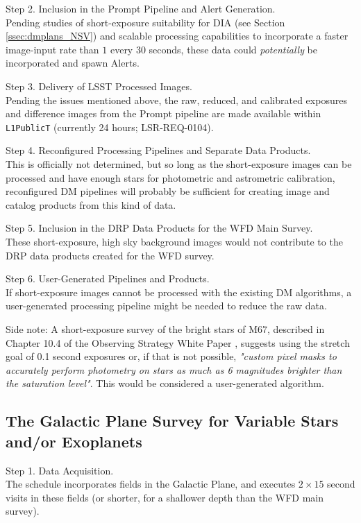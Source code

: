 \documentclass[DM,lsstdoc,toc]{lsstdoc}
\begin{document}
Step 2. Inclusion in the Prompt Pipeline and Alert Generation. \\
Pending studies of short-exposure suitability for DIA (see Section \ref{ssec:dmplans_NSV}) and scalable processing capabilities to incorporate a faster image-input rate than $1$ every $30$ seconds, these data could {\it potentially} be incorporated and spawn Alerts.

Step 3. Delivery of LSST Processed Images. \\
Pending the issues mentioned above, the raw, reduced, and calibrated exposures and difference images from the Prompt pipeline are made available within  \texttt{L1PublicT} (currently 24 hours; LSR-REQ-0104).

Step 4. Reconfigured Processing Pipelines and Separate Data Products. \\
This is officially not determined, but so long as the short-exposure images can be processed and have enough stars for photometric and astrometric calibration, reconfigured DM pipelines will probably be sufficient for creating image and catalog products from this kind of data.

Step 5. Inclusion in the DRP Data Products for the WFD Main Survey. \\
These short-exposure, high sky background images would not contribute to the DRP data products created for the WFD survey.

Step 6. User-Generated Pipelines and Products. \\
If short-exposure images cannot be processed with the existing DM algorithms, a user-generated processing pipeline might be needed to reduce the raw data. 

Side note: A short-exposure survey of the bright stars of M67, described in Chapter 10.4 of the Observing Strategy White Paper \citep{2017arXiv170804058L}, suggests using the stretch goal of 0.1 second exposures or, if that is not possible, \textit{"custom pixel masks to accurately perform photometry on stars as much as 6 magnitudes brighter than the saturation level"}. This would be considered a user-generated algorithm.


\subsection{The Galactic Plane Survey for Variable Stars and/or Exoplanets}\label{ssec:SPCS_GPVSEx}

Step 1. Data Acquisition. \\
The schedule incorporates fields in the Galactic Plane, and executes $2\times15$ second visits in these fields (or shorter, for a shallower depth than the WFD main survey).
\end{document}

